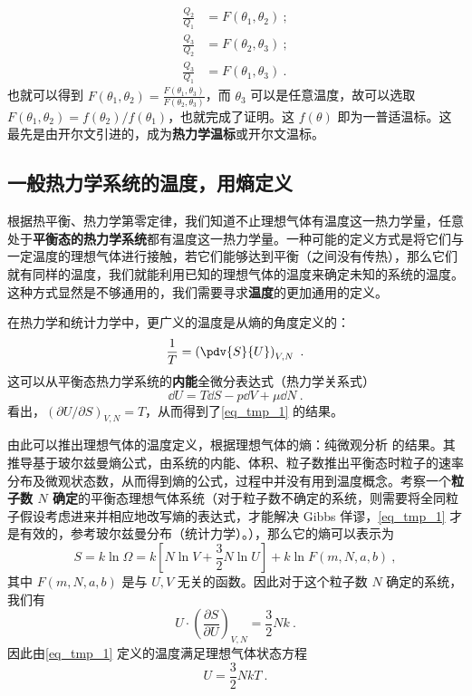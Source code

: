 \begin{equation}
\begin{aligned}
\frac{Q_2}{Q_1} &= F(\theta_1, \theta_2)~;\\
\frac{Q_3}{Q_2} &= F(\theta_2, \theta_3)~;\\
\frac{Q_3}{Q_1} &= F(\theta_1, \theta_3)~.
\end{aligned}
\end{equation}
也就可以得到 $F(\theta_1, \theta_2) = \frac{F(\theta_1, \theta_3)}{F(\theta_2, \theta_3)}$，而 $\theta_3$ 可以是任意温度，故可以选取 $F(\theta_1, \theta_2) = f(\theta_2)/f(\theta_1)$，也就完成了证明。这 $f(\theta)$ 即为一普适温标。这最先是由开尔文引进的，成为\textbf{热力学温标}或开尔文温标。

\subsection{一般热力学系统的温度，用熵定义}
根据热平衡、热力学第零定律，我们知道不止理想气体有温度这一热力学量，任意处于\textbf{平衡态的热力学系统}都有温度这一热力学量。一种可能的定义方式是将它们与一定温度的理想气体进行接触，若它们能够达到平衡（之间没有传热），那么它们就有同样的温度，我们就能利用已知的理想气体的温度来确定未知的系统的温度。这种方式显然是不够通用的，我们需要寻求\textbf{温度}的更加通用的定义。

在热力学和统计力学中，更广义的温度是从熵的角度定义的：
\begin{equation}\label{eq_tmp_1}
\frac{1}{T} = \left(\pdv{S}{U}\right)_{V,N} ~.
\end{equation}
这可以从平衡态热力学系统的\textbf{内能}全微分表达式（热力学关系式）
\begin{equation}
\dd U=T\dd S-p\dd V+\mu \dd N~.
\end{equation}
看出，$(\partial U/\partial S)_{V,N}=T$，从而得到了\autoref{eq_tmp_1} 的结果。

由此可以推出理想气体的温度定义，根据理想气体的熵：纯微观分析 的结果。其推导基于玻尔兹曼熵公式，由系统的内能、体积、粒子数推出平衡态时粒子的速率分布及微观状态数，从而得到熵的公式，过程中并没有用到温度概念。考察一个\textbf{粒子数 $N$ 确定}的平衡态理想气体系统（对于粒子数不确定的系统，则需要将全同粒子假设考虑进来并相应地改写熵的表达式，才能解决 Gibbs 佯谬，\autoref{eq_tmp_1} 才是有效的，参考玻尔兹曼分布（统计力学）。），那么它的熵可以表示为
\begin{equation}
S=k\ln \Omega =k\left[ N\ln V+\frac{3}{2}N\ln U \right] +k\ln F\left( m,N,a,b \right) ~,
\end{equation}
其中 $F(m,N,a,b)$ 是与 $U,V$ 无关的函数。因此对于这个粒子数 $N$ 确定的系统，我们有
\begin{equation}
U\cdot \left(\frac{\partial S}{\partial U}\right)_{V,N}=\frac{3}{2}Nk~.
\end{equation}
因此由\autoref{eq_tmp_1} 定义的温度满足理想气体状态方程
\begin{equation}
U=\frac{3}{2}NkT~.
\end{equation}
